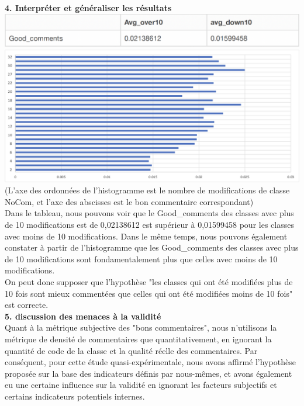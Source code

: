 \documentclass{article}
\begin{document}
\textbf{4. Interpréter et généraliser les résultats}\\

\includegraphics[scale=0.4]{T4_1.png}\\
\includegraphics[scale=0.6]{T4_2.png}\\

(L'axe des ordonnées de l'histogramme est le nombre de modifications de classe NoCom, et l'axe des abscisses est le bon commentaire correspondant)\\

Dans le tableau, nous pouvons voir que le Good\_comments des classes avec plus de 10 modifications est de 0,02138612 est supérieur à 0,01599458 pour les classes avec moins de 10 modifications. Dans le même temps, nous pouvons également constater à partir de l'histogramme que les Good\_comments des classes avec plus de 10 modifications sont fondamentalement plus que celles avec moins de 10 modifications.\\

On peut donc supposer que l'hypothèse "les classes qui ont été modifiées plus de 10 fois sont mieux commentées que celles qui ont été modifiées moins de 10 fois" est correcte.\\

\textbf{5. discussion des menaces à la validité}\\

Quant à la métrique subjective des "bons commentaires", nous n'utilisons la métrique de densité de commentaires que quantitativement, en ignorant la quantité de code de la classe et la qualité réelle des commentaires.
Par conséquent, pour cette étude quasi-expérimentale, nous avons affirmé l'hypothèse proposée sur la base des indicateurs définis par nous-mêmes, et avons également eu une certaine influence sur la validité en ignorant les facteurs subjectifs et certains indicateurs potentiels internes.
\end{document}
